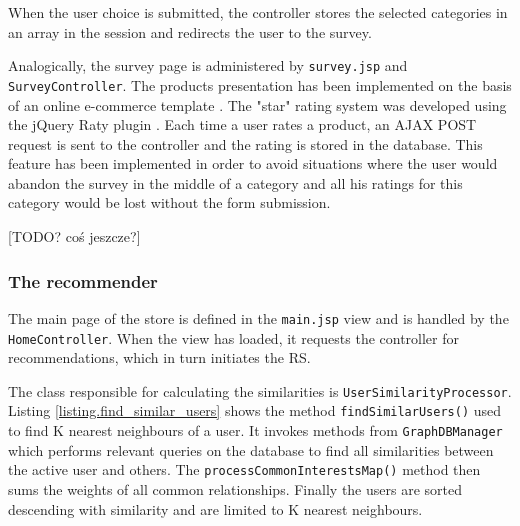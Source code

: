 \documentclass[12pt]{report}
\begin{document}
When the user choice is submitted, the controller stores the selected categories in an array in the session and redirects the user to the survey.

\hbox{}
Analogically, the survey page is administered by \texttt{survey\-.jsp} and \texttt{Survey\-Controller}. The products presentation has been implemented on the basis of an online e-commerce template \cite{bootply_ecommerce}. The "star" rating system was developed using the jQuery Raty plugin \cite{jquery_raty}. Each time a user rates a product, an AJAX POST request is sent to the controller and the rating is stored in the database. This feature has been implemented in order to avoid situations where the user would abandon the survey in the middle of a category and all his ratings for this category would be lost without the form submission.

[TODO? coś jeszcze?]

\subsubsection{The recommender}

The main page of the store is defined in the \texttt{main\-.jsp} view and is handled by the \texttt{HomeController}. When the view has loaded, it requests the controller for recommendations, which in turn initiates the RS.

The class responsible for calculating the similarities is \texttt{User\-Similarity\-Processor}. Listing \ref{listing.find_similar_users} shows the method \texttt{find\-Similar\-Users()} used to find K nearest neighbours of a user. It invokes methods from \texttt{GraphDB\-Manager} which performs relevant queries on the database to find all similarities between the active user and others. The \texttt{process\-Common\-Interests\-Map()} method then sums the weights of all common relationships. Finally the users are sorted descending with similarity and are limited to K nearest neighbours.
\end{document}
